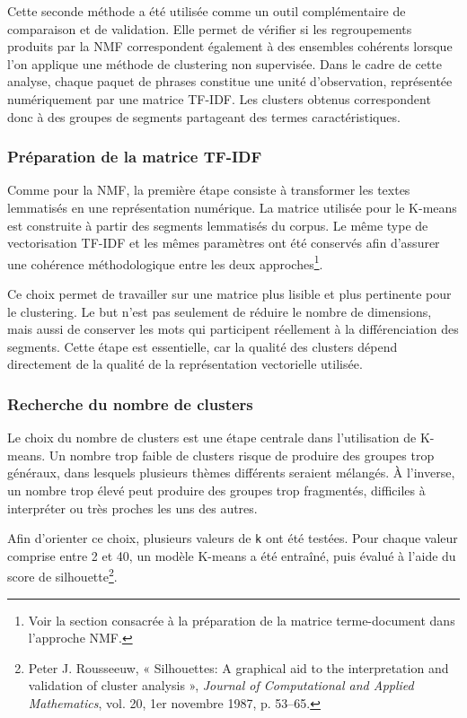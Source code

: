 Cette seconde méthode a été utilisée comme un outil complémentaire de comparaison et de validation. Elle permet de vérifier si les regroupements produits par la NMF correspondent également à des ensembles cohérents lorsque l'on applique une méthode de clustering non supervisée. Dans le cadre de cette analyse, chaque paquet de phrases constitue une unité d'observation, représentée numériquement par une matrice TF-IDF. Les clusters obtenus correspondent donc à des groupes de segments partageant des termes caractéristiques.

\subsubsection{Préparation de la matrice TF-IDF}

Comme pour la NMF, la première étape consiste à transformer les textes lemmatisés en une représentation numérique. La matrice utilisée pour le K-means est construite à partir des segments lemmatisés du corpus. Le même type de vectorisation TF-IDF et les mêmes paramètres ont été conservés afin d'assurer une cohérence méthodologique entre les deux approches\footnote{Voir la section consacrée à la préparation de la matrice terme-document dans l'approche NMF.}.

Ce choix permet de travailler sur une matrice plus lisible et plus pertinente pour le clustering. Le but n'est pas seulement de réduire le nombre de dimensions, mais aussi de conserver les mots qui participent réellement à la différenciation des segments. Cette étape est essentielle, car la qualité des clusters dépend directement de la qualité de la représentation vectorielle utilisée.

\subsubsection{Recherche du nombre de clusters}

Le choix du nombre de clusters est une étape centrale dans l'utilisation de K-means. Un nombre trop faible de clusters risque de produire des groupes trop généraux, dans lesquels plusieurs thèmes différents seraient mélangés. À l'inverse, un nombre trop élevé peut produire des groupes trop fragmentés, difficiles à interpréter ou très proches les uns des autres.

Afin d'orienter ce choix, plusieurs valeurs de \texttt{k} ont été testées. Pour chaque valeur comprise entre 2 et 40, un modèle K-means a été entraîné, puis évalué à l'aide du score de silhouette\footnote{Peter J. Rousseeuw, « Silhouettes: A graphical aid to the interpretation and validation of cluster analysis », \textit{Journal of Computational and Applied Mathematics}, vol. 20, 1er novembre 1987, p. 53--65.}.

